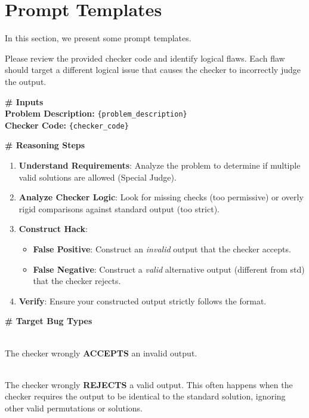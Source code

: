\documentclass[11pt]{article}
\begin{document}
\newpage
\onecolumn
\section{Prompt Templates\label{appx:prompts}}

In this section, we present some prompt templates.

\begin{promptbox}
\small
Please review the provided checker code and identify logical flaws. Each flaw should target a different logical issue that causes the checker to incorrectly judge the output.

\vspace{0.5em}
\noindent\textbf{\# Inputs} \\
\textbf{Problem Description:} \texttt{\{problem\_description\}} \\
\textbf{Checker Code:} \texttt{\{checker\_code\}}

\vspace{0.5em}
\noindent\textbf{\# Reasoning Steps}
\begin{enumerate}
    \setlength\itemsep{0em}
    \item \textbf{Understand Requirements}: Analyze the problem to determine if multiple valid solutions are allowed (Special Judge).
    \item \textbf{Analyze Checker Logic}: Look for missing checks (too permissive) or overly rigid comparisons against standard output (too strict).
    \item \textbf{Construct Hack}:
    \begin{itemize}
        \item \textbf{False Positive}: Construct an \textit{invalid} output that the checker accepts.
        \item \textbf{False Negative}: Construct a \textit{valid} alternative output (different from std) that the checker rejects.
    \end{itemize}
    \item \textbf{Verify}: Ensure your constructed output strictly follows the format.
\end{enumerate}

\vspace{0.5em}
\noindent\textbf{\# Target Bug Types}
\begin{description}
    \setlength\itemsep{0em}
    \item[Type 1: False Positive (Too Permissive)] \hfill \\
    The checker wrongly \textbf{ACCEPTS} an invalid output.
    \item[Type 2: False Negative (Too Strict)] \hfill \\
    The checker wrongly \textbf{REJECTS} a valid output. This often happens when the checker requires the output to be identical to the standard solution, ignoring other valid permutations or solutions.
\end{description}


\end{promptbox}
\end{document}
